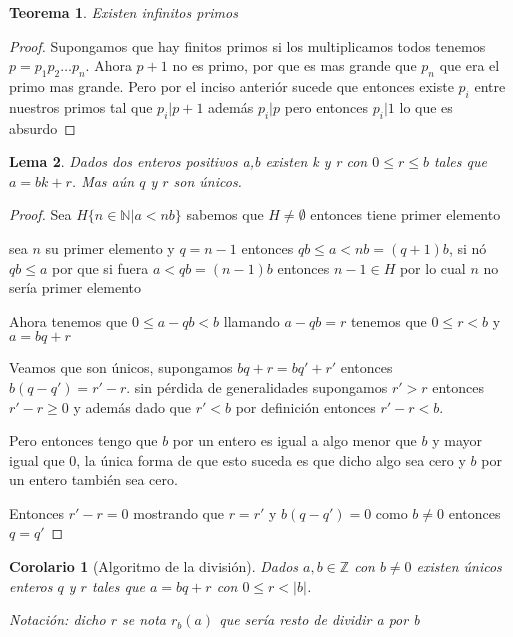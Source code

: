 \documentclass{article}
\theoremstyle{break}
\newtheorem{theorem}{Teorema}[section]
\newtheorem{corollary}{Corolario}[theorem]
\newtheorem{lemma}[theorem]{Lema}
\def \N{\mathbb{N}}
\def \Z{\mathbb{Z}}
\begin{document}
    \begin{theorem}
        Existen infinitos primos
    \end{theorem}
    \begin{proof}
        Supongamos que hay finitos primos si los multiplicamos todos tenemos $p = p_1p_2\ldots p_n$. Ahora $p+1$
        no es primo, por que es mas grande que $p_n$ que era el primo mas grande. Pero por el
        inciso anteriór sucede que entonces existe $p_i$ entre nuestros primos tal que $p_i |p+1$ además
        $p_i | p$ pero entonces $p_i |1$ lo que es absurdo
    \end{proof}

    \begin{lemma}
        Dados dos enteros positivos a,b existen k y r con $0\leq r \leq b $ tales que $a = bk + r $. Mas aún 
        $q$ y $r$ son únicos. 
    \end{lemma}
    \begin{proof}
        Sea $H\{n\in\N | a <nb \}$ sabemos que $H\neq \emptyset$ entonces tiene primer elemento

        sea $n$ su primer elemento y $q = n-1$ entonces $qb\leq a<nb = (q+1)b$, si nó $qb \leq a$ por que si fuera $a < qb = (n-1)b$ entonces
        $n-1 \in H$ por lo cual $n$ no sería primer elemento

        Ahora tenemos que $0 \leq a -qb < b $ llamando $a-qb = r$ tenemos que $0\leq r < b$ y $a = bq + r$

        Veamos que son únicos, supongamos $bq + r = bq' + r'$ entonces $b(q-q') = r' -r$. sin pérdida de generalidades supongamos $r' > r$
        entonces $r' -r \geq 0$ y además dado que $r'<b $ por definición entonces $r'-r < b$.

        Pero entonces tengo que $b$ por un entero es igual a algo menor que $b$ y mayor igual que 0, la única forma de que 
        esto suceda es que dicho algo sea cero y $b$ por un entero también sea cero.

        Entonces $r'-r = 0 $ mostrando que $r=r'$ y $b(q-q') = 0$ como $b\neq 0$ entonces $q=q'$
    \end{proof}

    \begin{corollary}[Algoritmo de la división]
        Dados $a,b \in \Z$ con $b\neq 0$ existen únicos enteros $q$ y $r$ tales que 
        $a = bq + r$ con $0 \leq r < |b|$. 
        
        Notación: dicho $r$ se nota $r_b(a)$ que sería resto de dividir a por b
    \end{corollary}
\end{document}
